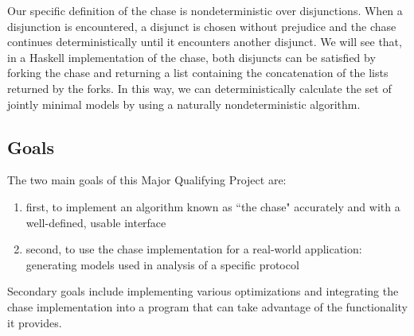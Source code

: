 		Our specific definition of the chase is nondeterministic over
		disjunctions. When a disjunction is encountered, a disjunct is chosen
		without prejudice and the chase continues deterministically until it
		encounters another disjunct. We will see that, in a Haskell
		implementation of the chase, both disjuncts can be satisfied by forking
		the chase and returning a list containing the concatenation of the
		lists returned by the forks. In this way, we can deterministically
		calculate the set of jointly minimal models by using a naturally
		nondeterministic algorithm.

	\subsection{Goals}

		The two main goals of this Major Qualifying Project are:

		\begin{enumerate}
		\item first, to implement an algorithm known as ``the chase" accurately
		and with a well-defined, usable interface
		\item second, to use the chase implementation for a real-world
		application: generating models used in analysis of a specific protocol
		\end{enumerate}

		Secondary goals include implementing various optimizations and
		integrating the chase implementation into a program that can take
		advantage of the functionality it provides.
